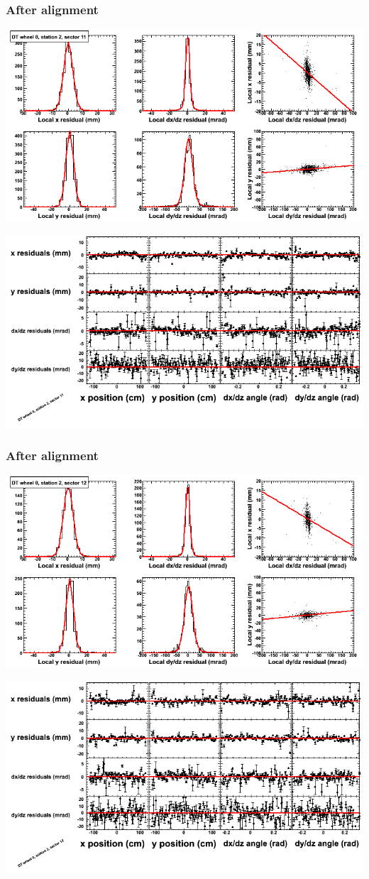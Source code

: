 \documentclass[compress]{beamer}
\begin{document}
\begin{frame}
\frametitle{After alignment}
\includegraphics[width=0.7\linewidth]{NOV4_fitfunctions/MBwhCst2sec11_bellcurves.png}

\includegraphics[width=0.7\linewidth]{NOV4_fitfunctions/MBwhCst2sec11_polynomials.png}
\end{frame}

\begin{frame}
\frametitle{After alignment}
\includegraphics[width=0.7\linewidth]{NOV4_fitfunctions/MBwhCst2sec12_bellcurves.png}

\includegraphics[width=0.7\linewidth]{NOV4_fitfunctions/MBwhCst2sec12_polynomials.png}
\end{frame}
\end{document}
